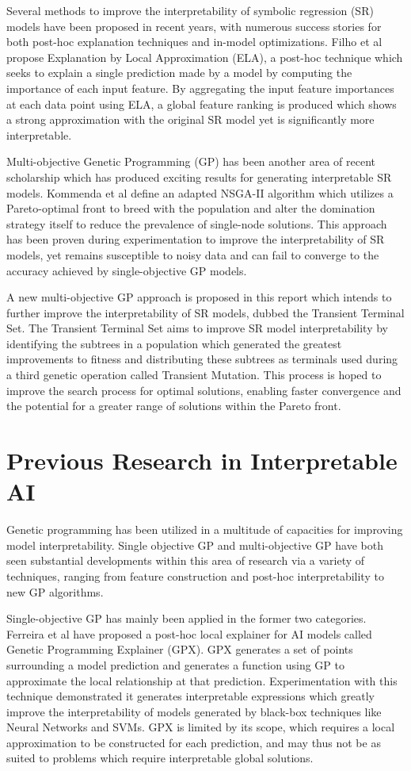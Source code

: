 \documentclass[a4paper, twocolumn]{article}
\begin{document}
Several methods to improve the interpretability of symbolic regression (SR) models have been proposed in recent years, with numerous success stories for both post-hoc explanation techniques and in-model optimizations. Filho et al propose Explanation by Local Approximation (ELA), a post-hoc technique which seeks to explain a single prediction made by a model by computing the importance of each input feature\cite{1}. By aggregating the input feature importances at each data point using ELA, a global feature ranking is produced which shows a strong approximation with the original SR model yet is significantly more interpretable.

Multi-objective Genetic Programming (GP) has been another area of recent scholarship which has produced exciting results for generating interpretable SR models. Kommenda et al define an adapted NSGA-II algorithm which utilizes a Pareto-optimal front to breed with the population and alter the domination strategy itself to reduce the prevalence of single-node solutions\cite{2}. This approach has been proven during experimentation to improve the interpretability of SR models, yet remains susceptible to noisy data and can fail to converge to the accuracy achieved by single-objective GP models.

A new multi-objective GP approach is proposed in this report which intends to further improve the interpretability of SR models, dubbed the Transient Terminal Set. The Transient Terminal Set aims to improve SR model interpretability by identifying the subtrees in a population which generated the greatest improvements to fitness and distributing these subtrees as terminals used during a third genetic operation called Transient Mutation. This process is hoped to improve the search process for optimal solutions, enabling faster convergence and the potential for a greater range of solutions within the Pareto front.

\section{Previous Research in Interpretable AI}

Genetic programming has been utilized in a multitude of capacities for improving model interpretability. Single objective GP and multi-objective GP have both seen substantial developments within this area of research via a variety of techniques, ranging from feature construction and post-hoc interpretability to new GP algorithms.

Single-objective GP has mainly been applied in the former two categories. Ferreira et al have proposed a post-hoc local explainer for AI models called Genetic Programming Explainer (GPX)\cite{4}. GPX generates a set of points surrounding a model prediction and generates a function using GP to approximate the local relationship at that prediction. Experimentation with this technique demonstrated it generates interpretable expressions which greatly improve the interpretability of models generated by black-box techniques like Neural Networks and SVMs. GPX is limited by its scope, which requires a local approximation to be constructed for each prediction, and may thus not be as suited to problems which require interpretable global solutions.
\end{document}
